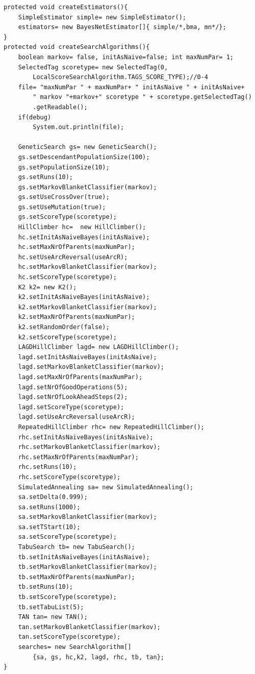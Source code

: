 \begin{lstlisting}[frame=single]  
protected void createEstimators(){
	SimpleEstimator simple= new SimpleEstimator();
	estimators= new BayesNetEstimator[]{ simple/*,bma, mn*/}; 
}
protected void createSearchAlgorithms(){
	boolean markov= false, initAsNaive=false; int maxNumPar= 1;
	SelectedTag scoretype= new SelectedTag(0, 
		LocalScoreSearchAlgorithm.TAGS_SCORE_TYPE);//0-4
	file= "maxNumPar " + maxNumPar+ " initAsNaive " + initAsNaive+ 
		" markov "+markov+" scoretype " + scoretype.getSelectedTag()
		.getReadable();
	if(debug)
		System.out.println(file);
	
	GeneticSearch gs= new GeneticSearch();
	gs.setDescendantPopulationSize(100);
	gs.setPopulationSize(10);
	gs.setRuns(10);	
	gs.setMarkovBlanketClassifier(markov);
	gs.setUseCrossOver(true);
	gs.setUseMutation(true);		
	gs.setScoreType(scoretype);
	HillClimber hc=  new HillClimber();
	hc.setInitAsNaiveBayes(initAsNaive);
	hc.setMaxNrOfParents(maxNumPar);
	hc.setUseArcReversal(useArcR);
	hc.setMarkovBlanketClassifier(markov);
	hc.setScoreType(scoretype);
	K2 k2= new K2();
	k2.setInitAsNaiveBayes(initAsNaive);
	k2.setMarkovBlanketClassifier(markov);
	k2.setMaxNrOfParents(maxNumPar);
	k2.setRandomOrder(false);
	k2.setScoreType(scoretype);
	LAGDHillClimber lagd= new LAGDHillClimber();
	lagd.setInitAsNaiveBayes(initAsNaive);
	lagd.setMarkovBlanketClassifier(markov);
	lagd.setMaxNrOfParents(maxNumPar);
	lagd.setNrOfGoodOperations(5);
	lagd.setNrOfLookAheadSteps(2);
	lagd.setScoreType(scoretype);
	lagd.setUseArcReversal(useArcR);
	RepeatedHillClimber rhc= new RepeatedHillClimber();
	rhc.setInitAsNaiveBayes(initAsNaive);
	rhc.setMarkovBlanketClassifier(markov);
	rhc.setMaxNrOfParents(maxNumPar);
	rhc.setRuns(10);
	rhc.setScoreType(scoretype);
	SimulatedAnnealing sa= new SimulatedAnnealing();
	sa.setDelta(0.999);
	sa.setRuns(1000);
	sa.setMarkovBlanketClassifier(markov);
	sa.setTStart(10);
	sa.setScoreType(scoretype);
	TabuSearch tb= new TabuSearch();
	tb.setInitAsNaiveBayes(initAsNaive);
	tb.setMarkovBlanketClassifier(markov);
	tb.setMaxNrOfParents(maxNumPar);
	tb.setRuns(10);
	tb.setScoreType(scoretype);
	tb.setTabuList(5);
	TAN tan= new TAN();
	tan.setMarkovBlanketClassifier(markov);
	tan.setScoreType(scoretype);
	searches= new SearchAlgorithm[]
		{sa, gs, hc,k2, lagd, rhc, tb, tan};
}
\end{lstlisting}

